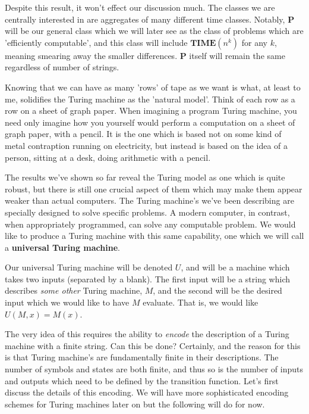Despite this result, it won't effect our discussion much. The classes we are centrally interested in are aggregates of many different time classes. Notably, $\bm{P}$ will be our general class which we will later see as the class of problems which are 'efficiently computable', and this class will include $\bm{TIME}(n^k)$ for any $k$, meaning smearing away the smaller differences. $\bm{P}$ itself will remain the same regardless of number of strings. 

Knowing that we can have as many 'rows' of tape as we want is what, at least to me, solidifies the Turing machine as the 'natural model'. Think of each row as a row on a sheet of graph paper. When imagining a program Turing machine, you need only imagine how you yourself would perform a computation on a sheet of graph paper, with a pencil. It is the one which is based not on some kind of metal contraption running on electricity, but instead is based on the idea of a person, sitting at a desk, doing arithmetic with a pencil. 

The results we've shown so far reveal the Turing model as one which is quite robust, but there is still one crucial aspect of them which may make them appear weaker than actual computers. The Turing machine's we've been describing are specially designed to solve specific problems. A modern computer, in contrast, when appropriately programmed, can solve any computable problem. We would like to produce a Turing machine with this same capability, one which we will call a \textbf{universal Turing machine}. 

Our universal Turing machine will be denoted $U$, and will be a machine which takes two inputs (separated by a blank). The first input will be a string which describes \textit{some other} Turing machine, $M$, and the second will be the desired input which we would like to have $M$ evaluate. That is, we would like $U(M,x) = M(x)$. 

The very idea of this requires the ability to \textit{encode} the description of a Turing machine with a finite string. Can this be done? Certainly, and the reason for this is that Turing machine's are fundamentally finite in their descriptions. The number of symbols and states are both finite, and thus so is the number of inputs and outputs which need to be defined by the transition function. Let's first discuss the details of this encoding. We will have more sophisticated encoding schemes for Turing machines later on but the following will do for now. 

